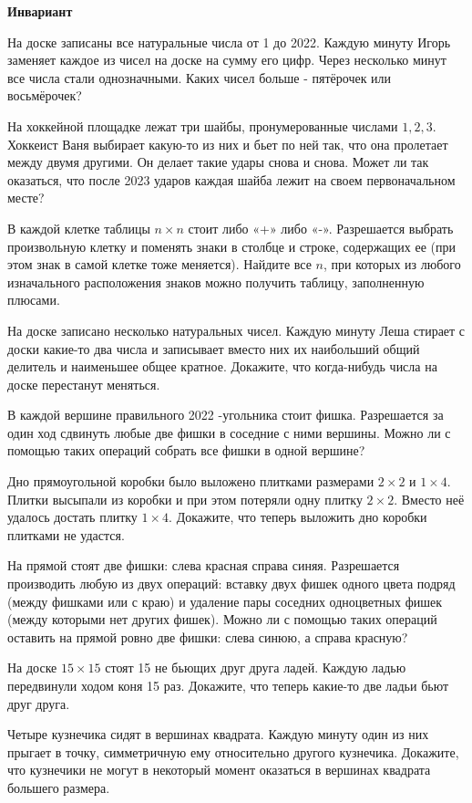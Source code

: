 \centerline{\bf \Huge Инвариант}

На доске записаны все натуральные числа от 1 до 2022. Каждую минуту Игорь заменяет каждое из чисел на доске на сумму его цифр. Через несколько минут все числа стали однозначными. Каких чисел больше - пятёрочек или восьмёрочек?

На хоккейной площадке лежат три шайбы, пронумерованные числами $1,2,3$. Хоккеист Ваня выбирает какую-то из них и бьет по ней так, что она пролетает между двумя другими. Он делает такие удары снова и снова. Может ли так оказаться, что после 2023 ударов каждая шайба лежит на своем первоначальном месте?

В каждой клетке таблицы $n \times n$ стоит либо «+» либо «-». Разрешается выбрать произвольную клетку и поменять знаки в столбце и строке, содержащих ее (при этом знак в самой клетке тоже меняется). Найдите все $n$, при которых из любого изначального расположения знаков можно получить таблицу, заполненную плюсами.

На доске записано несколько натуральных чисел. Каждую минуту Леша стирает с доски какие-то два числа и записывает вместо них их наибольший общий делитель и наименьшее общее кратное. Докажите, что когда-нибудь числа на доске перестанут меняться.

В каждой вершине правильного 2022 -угольника стоит фишка. Разрешается за один ход сдвинуть любые две фишки в соседние с ними вершины. Можно ли с помощью таких операций собрать все фишки в одной вершине?

Дно прямоугольной коробки было выложено плитками размерами $2 \times 2$ и $1 \times 4$. Плитки высыпали из коробки и при этом потеряли одну плитку $2 \times 2$. Вместо неё удалось достать плитку $1 \times 4$. Докажите, что теперь выложить дно коробки плитками не удастся.

На прямой стоят две фишки: слева красная справа синяя. Разрешается производить любую из двух операций: вставку двух фишек одного цвета подряд (между фишками или с краю) и удаление пары соседних одноцветных фишек (между которыми нет других фишек). Можно ли с помощью таких операций оставить на прямой ровно две фишки: слева синюю, а справа красную?

На доске $15 \times 15$ стоят 15 не бьющих друг друга ладей. Каждую ладью передвинули ходом коня 15 раз. Докажите, что теперь какие-то две ладьи бьют друг друга.

Четыре кузнечика сидят в вершинах квадрата. Каждую минуту один из них прыгает в точку, симметричную ему относительно другого кузнечика. Докажите, что кузнечики не могут в некоторый момент оказаться в вершинах квадрата большего размера.